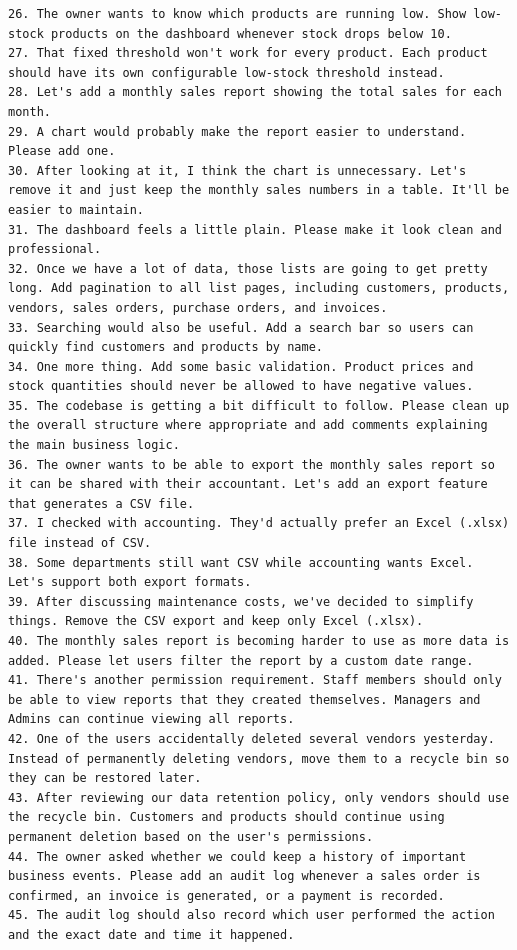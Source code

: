 \begin{lstlisting}[breaklines=true, basicstyle=\small\ttfamily]
26. The owner wants to know which products are running low. Show low-stock products on the dashboard whenever stock drops below 10.
27. That fixed threshold won't work for every product. Each product should have its own configurable low-stock threshold instead.
28. Let's add a monthly sales report showing the total sales for each month.
29. A chart would probably make the report easier to understand. Please add one.
30. After looking at it, I think the chart is unnecessary. Let's remove it and just keep the monthly sales numbers in a table. It'll be easier to maintain.
31. The dashboard feels a little plain. Please make it look clean and professional.
32. Once we have a lot of data, those lists are going to get pretty long. Add pagination to all list pages, including customers, products, vendors, sales orders, purchase orders, and invoices.
33. Searching would also be useful. Add a search bar so users can quickly find customers and products by name.
34. One more thing. Add some basic validation. Product prices and stock quantities should never be allowed to have negative values.
35. The codebase is getting a bit difficult to follow. Please clean up the overall structure where appropriate and add comments explaining the main business logic.
36. The owner wants to be able to export the monthly sales report so it can be shared with their accountant. Let's add an export feature that generates a CSV file.
37. I checked with accounting. They'd actually prefer an Excel (.xlsx) file instead of CSV.
38. Some departments still want CSV while accounting wants Excel. Let's support both export formats.
39. After discussing maintenance costs, we've decided to simplify things. Remove the CSV export and keep only Excel (.xlsx).
40. The monthly sales report is becoming harder to use as more data is added. Please let users filter the report by a custom date range.
41. There's another permission requirement. Staff members should only be able to view reports that they created themselves. Managers and Admins can continue viewing all reports.
42. One of the users accidentally deleted several vendors yesterday. Instead of permanently deleting vendors, move them to a recycle bin so they can be restored later.
43. After reviewing our data retention policy, only vendors should use the recycle bin. Customers and products should continue using permanent deletion based on the user's permissions.
44. The owner asked whether we could keep a history of important business events. Please add an audit log whenever a sales order is confirmed, an invoice is generated, or a payment is recorded.
45. The audit log should also record which user performed the action and the exact date and time it happened.
\end{lstlisting}

